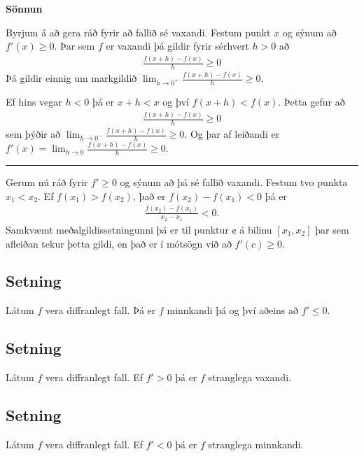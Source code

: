 \documentclass[a4paper,10pt,icelandic]{sphinxmanual}
\begin{document}
\textbf{Sönnun}

Byrjum á að gera ráð fyrir að fallið sé vaxandi. Festum punkt \(x\) og
sýnum að \(f'(x)\geq 0\). Þar sem \(f\) er vaxandi þá gildir fyrir
sérhvert \(h>0\) að
\begin{equation*}
\begin{split}\frac{f(x+h)-f(x)}{h} \geq 0\end{split}
\end{equation*}
Þá gildir einnig um markgildið \(\lim_{h\to 0^+} \frac{f(x+h)-f(x)}h \geq 0\).

Ef hins vegar \(h<0\) þá er \(x+h < x\) og því
\(f(x+h)<f(x)\). Þetta gefur að
\begin{equation*}
\begin{split}\frac{f(x+h)-f(x)}h \geq 0\end{split}
\end{equation*}
sem þýðir að \(\lim_{h\to 0^-} \frac{f(x+h)-f(x)}h \geq 0\). Og þar af leiðandi
er \(f'(x) = \lim_{h\to 0} \frac{f(x+h)-f(x)}h \geq 0\).


\bigskip\hrule{}\bigskip


Gerum nú ráð fyrir \(f'\geq 0\) og sýnum að þá sé fallið vaxandi.
Festum tvo punkta \(x_1 < x_2\). Ef \(f(x_1) > f(x_2)\), það er
\(f(x_2)-f(x_1)<0\)
þá er
\begin{equation*}
\begin{split}\frac{f(x_2)-f(x_1)}{x_2-x_1} < 0.\end{split}
\end{equation*}
Samkvæmt meðalgildissetningunni þá er til punktur \(¢\) á bilinu \([x_1,x_2]\)
þar sem afleiðan tekur þetta gildi, en það er í mótsögn við að  \(f'(c)\geq 0\).


\subsection{Setning}
\label{kafli03:minnkandieoae}\label{kafli03:id16}
Látum \(f\) vera diffranlegt fall. Þá er \(f\) minnkandi þá og
því aðeins að \(f' \leq 0\).


\subsection{Setning}
\label{kafli03:id17}
Látum \(f\) vera diffranlegt fall. Ef \(f'>0\) þá er \(f\)
stranglega vaxandi.


\subsection{Setning}
\label{kafli03:id18}
Látum \(f\) vera diffranlegt fall. Ef \(f'<0\) þá er \(f\)
stranglega minnkandi.
\end{document}
